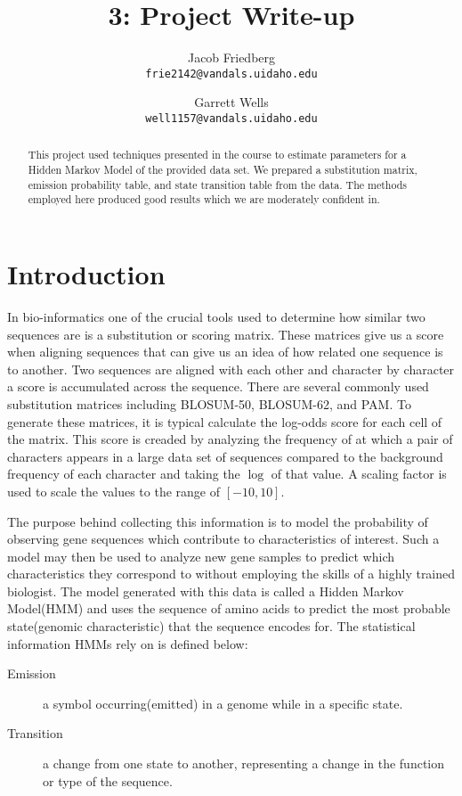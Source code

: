 \documentclass[a4paper,11pt]{article}
\title{3: Project Write-up}
\author{
Jacob Friedberg \\
\texttt{frie2142@vandals.uidaho.edu}
\and
Garrett Wells \\
\texttt{well1157@vandals.uidaho.edu}
}
\begin{document}
\maketitle
\begin{abstract}
    \noindent This project used techniques presented in the course to estimate parameters for a Hidden Markov Model of the provided data set. We prepared a substitution matrix, emission probability table, and state transition table from the data. The methods employed here produced good results which we are moderately confident in.
\end{abstract}

\section{Introduction}

In bio-informatics one of the crucial tools used to determine how similar two sequences are is a substitution or scoring matrix. These matrices give us a score when aligning sequences that can give us an idea of how related one sequence is to another. Two sequences are aligned with each other and character by character a score is accumulated across the sequence. There are several commonly used substitution matrices including BLOSUM-50, BLOSUM-62, and PAM. To generate these matrices, it is typical calculate the log-odds score for each cell of the matrix. This score is creaded by analyzing  the frequency of at which a pair of characters appears in a large data set of sequences compared to the background frequency of each character and taking the $\log$ of that value. A scaling factor is used to scale the values to the range of $[-10,10]$. 


The purpose behind collecting this information is to model the probability of observing gene sequences which contribute to characteristics of interest. Such a model may then be used to analyze new gene samples to predict which characteristics they correspond to without employing the skills of a highly trained biologist. The model generated with this data is called a Hidden Markov Model(HMM) and uses the sequence of amino acids to predict the most probable state(genomic characteristic) that the sequence encodes for. The statistical information HMMs rely on is defined below:

\begin{description}
    \item[Emission] a symbol occurring(emitted) in a genome while in a specific state.
    \item[Transition] a change from one state to another, representing a change in the function or type of the sequence.
\end{description}
\end{document}

